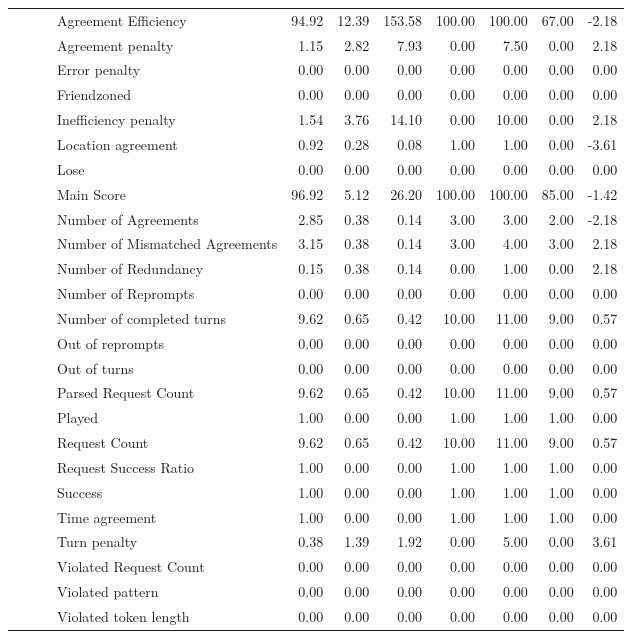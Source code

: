\begin{tabular}{llllrrrrrrr}
 &  &  & Agreement Efficiency & 94.92 & 12.39 & 153.58 & 100.00 & 100.00 & 67.00 & -2.18 \\
 &  &  & Agreement penalty & 1.15 & 2.82 & 7.93 & 0.00 & 7.50 & 0.00 & 2.18 \\
 &  &  & Error penalty & 0.00 & 0.00 & 0.00 & 0.00 & 0.00 & 0.00 & 0.00 \\
 &  &  & Friendzoned & 0.00 & 0.00 & 0.00 & 0.00 & 0.00 & 0.00 & 0.00 \\
 &  &  & Inefficiency penalty & 1.54 & 3.76 & 14.10 & 0.00 & 10.00 & 0.00 & 2.18 \\
 &  &  & Location agreement & 0.92 & 0.28 & 0.08 & 1.00 & 1.00 & 0.00 & -3.61 \\
 &  &  & Lose & 0.00 & 0.00 & 0.00 & 0.00 & 0.00 & 0.00 & 0.00 \\
 &  &  & Main Score & 96.92 & 5.12 & 26.20 & 100.00 & 100.00 & 85.00 & -1.42 \\
 &  &  & Number of Agreements & 2.85 & 0.38 & 0.14 & 3.00 & 3.00 & 2.00 & -2.18 \\
 &  &  & Number of Mismatched Agreements & 3.15 & 0.38 & 0.14 & 3.00 & 4.00 & 3.00 & 2.18 \\
 &  &  & Number of Redundancy & 0.15 & 0.38 & 0.14 & 0.00 & 1.00 & 0.00 & 2.18 \\
 &  &  & Number of Reprompts & 0.00 & 0.00 & 0.00 & 0.00 & 0.00 & 0.00 & 0.00 \\
 &  &  & Number of completed turns & 9.62 & 0.65 & 0.42 & 10.00 & 11.00 & 9.00 & 0.57 \\
 &  &  & Out of reprompts & 0.00 & 0.00 & 0.00 & 0.00 & 0.00 & 0.00 & 0.00 \\
 &  &  & Out of turns & 0.00 & 0.00 & 0.00 & 0.00 & 0.00 & 0.00 & 0.00 \\
 &  &  & Parsed Request Count & 9.62 & 0.65 & 0.42 & 10.00 & 11.00 & 9.00 & 0.57 \\
 &  &  & Played & 1.00 & 0.00 & 0.00 & 1.00 & 1.00 & 1.00 & 0.00 \\
 &  &  & Request Count & 9.62 & 0.65 & 0.42 & 10.00 & 11.00 & 9.00 & 0.57 \\
 &  &  & Request Success Ratio & 1.00 & 0.00 & 0.00 & 1.00 & 1.00 & 1.00 & 0.00 \\
 &  &  & Success & 1.00 & 0.00 & 0.00 & 1.00 & 1.00 & 1.00 & 0.00 \\
 &  &  & Time agreement & 1.00 & 0.00 & 0.00 & 1.00 & 1.00 & 1.00 & 0.00 \\
 &  &  & Turn penalty & 0.38 & 1.39 & 1.92 & 0.00 & 5.00 & 0.00 & 3.61 \\
 &  &  & Violated Request Count & 0.00 & 0.00 & 0.00 & 0.00 & 0.00 & 0.00 & 0.00 \\
 &  &  & Violated pattern & 0.00 & 0.00 & 0.00 & 0.00 & 0.00 & 0.00 & 0.00 \\
 &  &  & Violated token length & 0.00 & 0.00 & 0.00 & 0.00 & 0.00 & 0.00 & 0.00 \\
\cline{1-11} \cline{2-11} \cline{3-11}
\bottomrule
\end{tabular}
